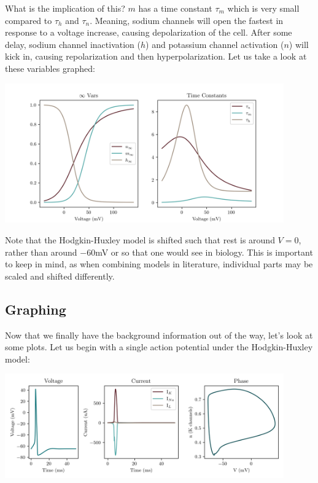What is the implication of this? $m$ has a time constant $\tau_m$ which is very small compared to $\tau_h$ and $\tau_n$. Meaning, sodium channels will open the fastest in response to a voltage increase, causing depolarization of the cell. After some delay, sodium channel inactivation ($h$) and potassium channel activation ($n$) will kick in, causing repolarization and then hyperpolarization. Let us take a look at these variables graphed: 

\begin{center}
\includegraphics[width=0.9\textwidth]{images/models/hhconsts.png}
\end{center}

Note that the Hodgkin-Huxley model is shifted such that rest is around $V = 0$, rather than around $-60$mV or so that one would see in biology. This is important to keep in mind, as when combining models in literature, individual parts may be scaled and shifted differently. 

\subsection{Graphing}

Now that we finally have the background information out of the way, let's look at some plots. Let us begin with a single action potential under the Hodgkin-Huxley model: 

\begin{center}
\includegraphics[width=0.9\textwidth]{images/models/hh1.png}
\end{center}

